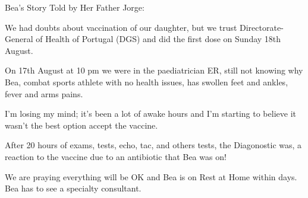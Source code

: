 Bea’s Story Told by Her Father Jorge:

We had doubts about vaccination of our daughter, but we trust
Directorate-General of Health of Portugal (DGS) and did the first dose on Sunday
18th August.

On 17th August at 10 pm we were in the paediatrician ER, still not knowing why
Bea, combat sports athlete with no health issues, has swollen feet and ankles,
fever and arms pains.

I’m losing my mind; it’s been a lot of awake hours and I’m starting to believe
it wasn’t the best option accept the vaccine.

After 20 hours of exams, tests, echo, tac, and others tests, the Diagonostic
was, a reaction to the vaccine due to an antibiotic that Bea was on!

We are praying everything will be OK and Bea is on Rest at Home within days. Bea
has to see a specialty consultant.

